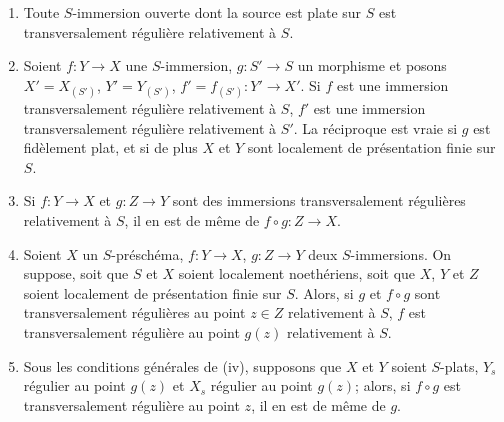 \begin{proposition}[19.2.7]
\label{IV.19.2.7}
\begin{enumerate}
  \item[(i)] Toute $S$-immersion ouverte dont la source est plate sur $S$ est transversalement régulière relativement à $S$.
  \item[(ii)] Soient $f:Y\to X$ une $S$-immersion, $g:S'\to S$ un morphisme et posons $X'=X_{(S')}$, $Y'=Y_{(S')}$, $f'=f_{(S')}:Y'\to X'$. Si $f$ est une immersion transversalement régulière relativement à $S$, $f'$ est une immersion transversalement régulière relativement à $S'$. La réciproque est vraie si $g$ est fidèlement plat, et si de plus $X$ et $Y$ sont localement de présentation finie sur $S$.
  \item[(iii)] Si $f:Y\to X$ et $g:Z\to Y$ sont des immersions transversalement régulières relativement à $S$, il en est de même de $f\circ g:Z\to X$.
  \item[(iv)] Soient $X$ un $S$-préschéma, $f:Y\to X$, $g:Z\to Y$ deux $S$-immersions. On suppose, soit que $S$ et $X$ soient localement noethériens, soit que $X$, $Y$ et $Z$ soient localement de présentation finie sur $S$. Alors, si $g$ et $f\circ g$ sont transversalement régulières au point $z\in Z$ relativement à $S$, $f$ est transversalement régulière au point $g(z)$ relativement à $S$.
  \item[(v)] Sous les conditions générales de (iv), supposons que $X$ et $Y$ soient $S$-plats, $Y_s$ régulier au point $g(z)$ et $X_s$ régulier au point $g(z)$; alors, si $f\circ g$ est transversalement régulière au point $z$, il en est de même de $g$.
\end{enumerate}
\end{proposition}

